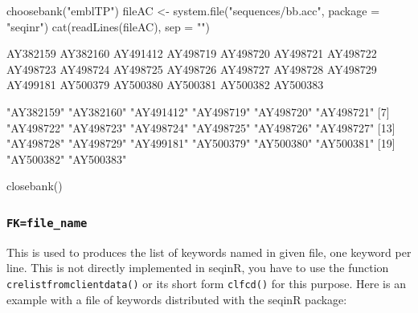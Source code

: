 \documentclass{article}
\begin{document}
\begin{Schunk}
\begin{Sinput}
 choosebank("emblTP")
 fileAC <- system.file("sequences/bb.acc", package = "seqinr")
 cat(readLines(fileAC), sep = "\n")
\end{Sinput}
\begin{Soutput}
AY382159
AY382160
AY491412
AY498719
AY498720
AY498721
AY498722
AY498723
AY498724
AY498725
AY498726
AY498727
AY498728
AY498729
AY499181
AY500379
AY500380
AY500381
AY500382
AY500383
\end{Soutput}
\begin{Soutput}
 [1] "AY382159" "AY382160" "AY491412" "AY498719" "AY498720" "AY498721"
 [7] "AY498722" "AY498723" "AY498724" "AY498725" "AY498726" "AY498727"
[13] "AY498728" "AY498729" "AY499181" "AY500379" "AY500380" "AY500381"
[19] "AY500382" "AY500383"
\end{Soutput}
\begin{Sinput}
 closebank()
\end{Sinput}
\end{Schunk}


\subsubsection{\texttt{FK=file\_name}}

This is used to produces the list of keywords named in given file, one keyword per line.
This is not directly implemented in seqinR, you have to use the function
\texttt{crelistfromclientdata()} or its short form \texttt{clfcd()} for this purpose. Here is an example with
a file of keywords distributed with the seqinR package:
\end{document}
